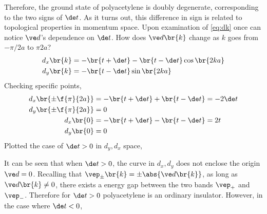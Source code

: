 \documentclass{article}
\begin{document}
Therefore, the ground state of polyacetylene is doubly degenerate, corresponding to the two signs of $\de t$. As it turns out, this difference in sign is related to topological properties in momentum space. Upon examination of \cref{eq:dk} once can notice $\ve d$'s dependence on $\de t$. How does $\ve d\br{k}$ change as $k$ goes from $- \pi / 2a$ to $\pi  2a$?
\begin{align*}
\begin{split}
d_x \br{k} &= - \br{t + \de t} - \br{t - \de t} \cos\br{2 ka} \\
d_y \br{k} &= - \br{t - \de t} \sin\br{2 ka}
\end{split}
\end{align*}
Checking specific points,
\begin{align*}
d_x \br{\pm\f{\pi}{2a}} &= - \br{t + \de t} + \br{t - \de t} = - 2 \de t\\
d_y \br{\pm\f{\pi}{2a}} &= 0 \\
d_x \br{0} &= - \br{t + \de t} - \br{t - \de t} = 2 t\\
d_y \br{0} &= 0
\end{align*}
Plotted the case of $\de t >0$ in $d_y, d_x$ space,
\begin{center}
\end{center}
It can be seen that when $\de t > 0$, the curve in $d_x, d_y$ does not enclose the origin $\ve d = 0$. Recalling that $\vep_{\pm}\br{k} = \pm \abs{\ve d \br{k}}$, as long as $\ve d\br{k} \neq 0$, there exists a energy gap between the two bands $\vep_{+}$ and $\vep_{-}$. Therefore for $\de t > 0$ polyacetylene is an ordinary insulator. However, in the case where $\de t < 0$,
\begin{center}
\end{center}
\end{document}
